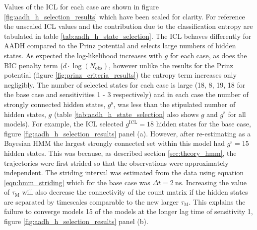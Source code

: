 Values of the ICL for each case are shown in figure \ref{fig:aadh_h_selection_results} which have been scaled for clarity. For reference the unscaled ICL values and the contribution due to the classification entropy are tabulated in table \ref{tab:aadh_h_state_selection}. The ICL behaves differently for AADH compared to the Prinz potential and selects large numbers of hidden states. As expected the log-likelihood increases with $g$ for each case, as does the BIC penalty term ($d\cdot\log{\left(N_{\mathrm{obs}}\right)}$, however unlike the results for the Prinz potential (figure \ref{fig:prinz_criteria_results}) the entropy term increases only negligibly. The number of selected states for each case is large (18, 8, 19, 18 for the base case and sensitivities 1 - 3 respectively) and in each case the number of strongly connected hidden states, $g^{\mathrm{s}}$, was less than the stipulated number of hidden states, $g$ (table \ref{tab:aadh_h_state_selection} also shows $g$ and $g^{\mathrm{s}}$ for all models). For example, the ICL selected $g^{\mathrm{ICL}}=18$ hidden states for the base case, figure \ref{fig:aadh_h_selection_results} panel (a). However, after re-estimating as a Bayesian HMM the largest strongly connected set within this model had  $g^{\mathrm{s}}=15$ hidden states. This was because, as described section \ref{sec:theory_hmm}, the trajectories were first strided so that the observations were approximately independent. The striding interval was estimated from the data using  equation \ref{eqn:hmm_striding} which for the base case was $\Delta t = \SI{2}{\nano\second}$. Increasing the value of $\tau_{\mathrm{M}}$ will also decrease the connectivity of the count matrix if the hidden states are separated by timescales comparable to the new larger $\tau_{\mathrm{M}}$. This explains the failure to converge models 15 of the models at the longer lag time of sensitivity 1, figure \ref{fig:aadh_h_selection_results} panel (b).   


